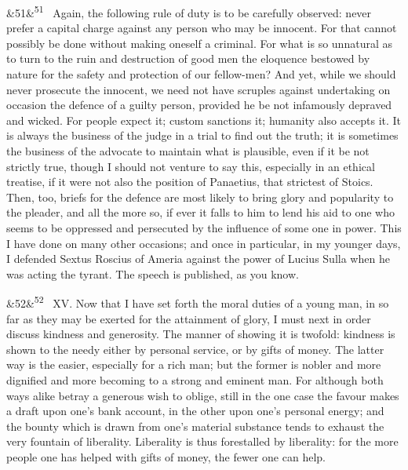 \documentclass[12pt]{article}
\newcommand{\para}[1][]{\par\noindent\ifx&#1&\else\textsuperscript{\footnotesize #1}~\fi}
\begin{document}
\para[51] Again, the following rule of duty is to be carefully observed: never prefer a capital charge against any person who may be innocent. For that cannot possibly be done without making oneself a criminal. For what is so unnatural as to turn to the ruin and destruction of good men the eloquence bestowed by nature for the safety and protection of our fellow-men? And yet, while we should never prosecute the innocent, we need not have scruples against undertaking on occasion the defence of a guilty person, provided he be not infamously depraved and wicked. For people expect it; custom sanctions it; humanity also accepts it. It is always the business of the judge in a trial to find out the truth; it is sometimes the business of the advocate to maintain what is plausible, even if it be not strictly true, though I should not venture to say this, especially in an ethical treatise, if it were not also the position of Panaetius, that strictest of Stoics. Then, too, briefs for the defence are most likely to bring glory and popularity to the pleader, and all the more so, if ever it falls to him to lend his aid to one who seems to be oppressed and persecuted by the influence of some one in power. This I have done on many other occasions; and once in particular, in my younger days, I defended Sextus Roscius of Ameria against the power of Lucius Sulla when he was acting the tyrant. The speech is published, as you know.

\para[52] XV. Now that I have set forth the moral duties of a young man, in so far as they may be exerted for the attainment of glory, I must next in order discuss kindness and generosity. The manner of showing it is twofold: kindness is shown to the needy either by personal service, or by gifts of money. The latter way is the easier, especially for a rich man; but the former is nobler and more dignified and more becoming to a strong and eminent man. For although both ways alike betray a generous wish to oblige, still in the one case the favour makes a draft upon one's bank account, in the other upon one's personal energy; and the bounty which is drawn from one's material substance tends to exhaust the very fountain of liberality. Liberality is thus forestalled by liberality: for the more people one has helped with gifts of money, the fewer one can help.
\end{document}
